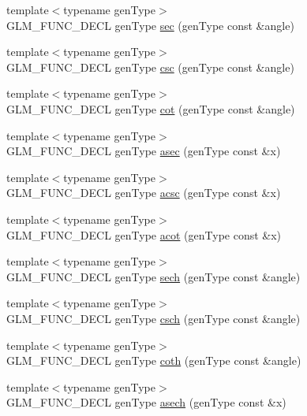\begin{CompactItemize}
\item 
{\footnotesize template$<$typename genType$>$ }\\GLM\_\-FUNC\_\-DECL genType \hyperlink{group__gtc__reciprocal_gef67dab7093a4d0ccc9c06ca05ddafd4}{sec} (genType const \&angle)
\item 
{\footnotesize template$<$typename genType$>$ }\\GLM\_\-FUNC\_\-DECL genType \hyperlink{group__gtc__reciprocal_gdadd7293102fe18951a4acb4df1455a8}{csc} (genType const \&angle)
\item 
{\footnotesize template$<$typename genType$>$ }\\GLM\_\-FUNC\_\-DECL genType \hyperlink{group__gtc__reciprocal_g8d3b73a481ad1115ca93da1410868e10}{cot} (genType const \&angle)
\item 
{\footnotesize template$<$typename genType$>$ }\\GLM\_\-FUNC\_\-DECL genType \hyperlink{group__gtc__reciprocal_g79e2b1e9949a6c514eef05d462ab01a0}{asec} (genType const \&x)
\item 
{\footnotesize template$<$typename genType$>$ }\\GLM\_\-FUNC\_\-DECL genType \hyperlink{group__gtc__reciprocal_g921be8522fbf0a5cfc877e78fb9abed2}{acsc} (genType const \&x)
\item 
{\footnotesize template$<$typename genType$>$ }\\GLM\_\-FUNC\_\-DECL genType \hyperlink{group__gtc__reciprocal_ge06055493cfcf5e3732cf330d81fd186}{acot} (genType const \&x)
\item 
{\footnotesize template$<$typename genType$>$ }\\GLM\_\-FUNC\_\-DECL genType \hyperlink{group__gtc__reciprocal_g6193b8e823dea616d6badca8076da066}{sech} (genType const \&angle)
\item 
{\footnotesize template$<$typename genType$>$ }\\GLM\_\-FUNC\_\-DECL genType \hyperlink{group__gtc__reciprocal_g094e1e421d5d9320d4364deb82adb428}{csch} (genType const \&angle)
\item 
{\footnotesize template$<$typename genType$>$ }\\GLM\_\-FUNC\_\-DECL genType \hyperlink{group__gtc__reciprocal_g8bc5d51e10b478b061a071eb91258d35}{coth} (genType const \&angle)
\item 
{\footnotesize template$<$typename genType$>$ }\\GLM\_\-FUNC\_\-DECL genType \hyperlink{group__gtc__reciprocal_g05d1bc30693d02a9a08c9044d75c5333}{asech} (genType const \&x)

\end{CompactItemize}
